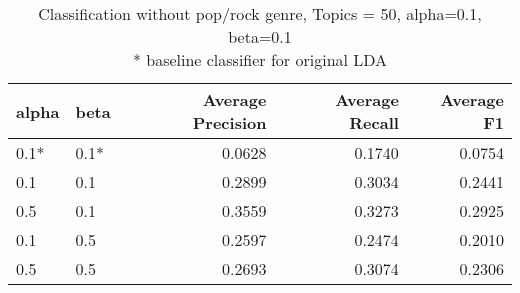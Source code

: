 \begin{table}[h]
\centering
\begin{tabular}{|l|l|r|r|r|}

\hline
\textbf{alpha} & \textbf{beta} &  \textbf{Average Precision} & \textbf{Average Recall} & \textbf{Average F1} \\
\hline
0.1* & 0.1* & 0.0628&  0.1740 &	0.0754\\
0.1 & 0.1 & 0.2899 	&0.3034 &	0.2441\\
0.5 & 0.1 & 0.3559	& 0.3273	& 0.2925\\
0.1 & 0.5 & 0.2597 & 	0.2474 & 	0.2010\\
0.5 & 0.5	&	0.2693 &	0.3074 &	0.2306\\
\hline
\end{tabular}
\caption{Classification without pop/rock genre, Topics = 50, alpha=0.1, beta=0.1\\ * baseline classifier for original LDA}
\end{table}
